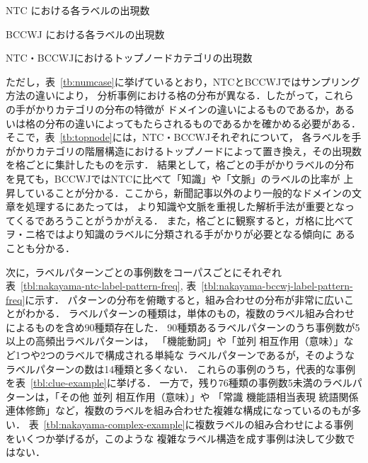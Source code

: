 \documentclass[japanese]{jnlp_1.4}
\begin{document}
\begin{table}[b]
\begin{minipage}[t]{0.45\hsize}
\caption{NTC における各ラベルの出現数}
\label{tbl:nakayama-ntc-label-freq}

\end{minipage}
\hfill
\begin{minipage}[t]{0.45\hsize}
\caption{BCCWJ における各ラベルの出現数}
\label{tbl:nakayama-bccwj-label-freq}

\end{minipage}
\end{table}
\begin{table}[b]
\caption{NTC・BCCWJにおけるトップノードカテゴリの出現数}
\label{tb:topnode}

\end{table}

ただし，表~\ref{tb:numcase}に挙げているとおり，NTCとBCCWJではサンプリング方法の違いにより，
分析事例における格の分布が異なる．したがって，これらの手がかりカテゴリの分布の特徴が
ドメインの違いによるものであるか，あるいは格の分布の違いによってもたらされるものであるかを確かめる必要がある．
そこで，表~\ref{tb:topnode}には，NTC・BCCWJそれぞれについて，
各ラベルを手がかりカテゴリの階層構造におけるトップノードによって置き換え，その出現数を格ごとに集計したものを示す．
結果として，格ごとの手がかりラベルの分布を見ても，BCCWJではNTCに比べて「知識」や「文脈」のラベルの比率が
上昇していることが分かる．ここから，新聞記事以外のより一般的なドメインの文章を処理するにあたっては，
より知識や文脈を重視した解析手法が重要となってくるであろうことがうかがえる．
また，格ごとに観察すると，ガ格に比べてヲ・ニ格ではより知識のラベルに分類される手がかりが必要となる傾向に
あることも分かる．

次に，ラベルパターンごとの事例数をコーパスごとにそれぞれ
表~\ref{tbl:nakayama-ntc-label-pattern-freq}, 表~\ref{tbl:nakayama-bccwj-label-pattern-freq}に示す．
パターンの分布を俯瞰すると，組み合わせの分布が非常に広いことがわかる．
ラベルパターンの種類は，単体のもの，複数のラベル組み合わせによるものを含め$90$種類存在した．
90種類あるラベルパターンのうち事例数が5以上の高頻出ラベルパターンは，
「機能動詞」や「並列 相互作用（意味）」など1つや2つのラベルで構成される単純な
ラベルパターンであるが，そのようなラベルパターンの数は14種類と多くない．
これらの事例のうち，代表的な事例を表~\ref{tbl:clue-example}に挙げる．
一方で，残り76種類の事例数5未満のラベルパターンは，「その他 並列 相互作用（意味）」や
「常識 機能語相当表現 統語関係 連体修飾」など，複数のラベルを組み合わせた複雑な構成になっているのもが多い．
表~\ref{tbl:nakayama-complex-example}に複数ラベルの組み合わせによる事例をいくつか挙げるが，このような
複雑なラベル構造を成す事例は決して少数ではない．
\end{document}
